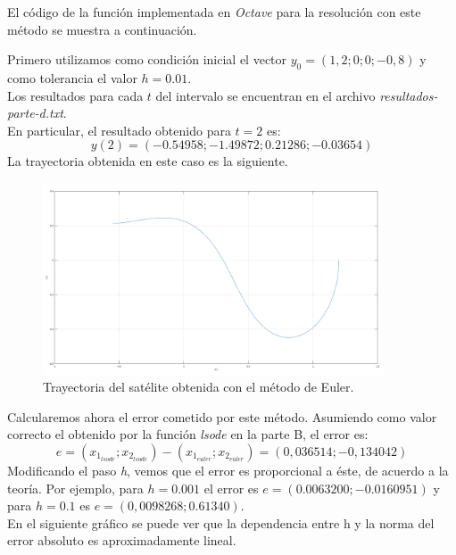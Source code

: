 \documentclass[titlepage,a4paper]{article}
\begin{document}
	El código de la función implementada en \emph{Octave} para la resolución con este método se muestra a continuación.
	
	Primero utilizamos como condición inicial el vector $ y_0 = (1,2; 0; 0; -0,8) $ y como tolerancia el valor $ h = 0.01 $.\\
	Los resultados para cada $t$ del intervalo se encuentran en el archivo \emph{resultados-parte-d.txt}.\\
	En particular, el resultado obtenido para $t=2$ es:
	\begin{equation}
		y(2) = (-0.54958; -1.49872; 0.21286; -0.03654)
	\end{equation}
	La trayectoria obtenida en este caso es la siguiente.\\
	\begin{figure}[H]
		\centering
		\includegraphics[width=0.9\textwidth]{parted.png}
		\caption{\label{fig:parted}Trayectoria del satélite obtenida con el método de Euler.}
	\end{figure}
	Calcularemos ahora el error cometido por este método. Asumiendo como valor correcto el obtenido por la función \emph{lsode} en la parte B, el error es:
	\begin{equation}
		e = (x_{1_{lsode}}; x_{2_{lsode}}) - (x_{1_{euler}}; x_{2_{euler}}) = (0,036514; -0,134042)
	\end{equation}
	Modificando el paso \emph{h}, vemos que el error es proporcional a éste, de acuerdo a la teoría. Por ejemplo, para $ h = 0.001 $ el error es $ e = (0.0063200;-0.0160951) $ y para $ h = 0.1 $ es $ e = (0,0098268;0.61340) $. \\
	En el siguiente gráfico se puede ver que la dependencia entre h y la norma del error absoluto es aproximadamente lineal.\\
\end{document}
